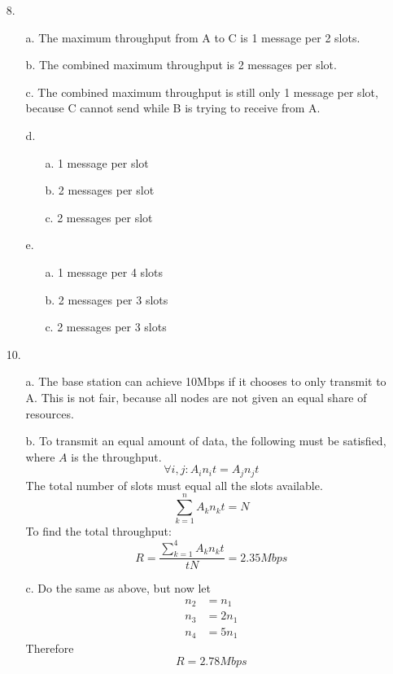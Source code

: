 \documentclass[11pt]{article}
\begin{document}
\begin{itemize}
  \item[8.]
    \begin{itemize}
      \item[a.] The maximum throughput from A to C is 1 message per 2 slots.
      \item[b.] The combined maximum throughput is 2 messages per slot.
      \item[c.] The combined maximum throughput is still only 1 message per
        slot, because C cannot send while B is trying to receive from A.
      \item[d.]
        \begin{itemize}
          \item[a.] 1 message per slot
          \item[b.] 2 messages per slot
          \item[c.] 2 messages per slot
        \end{itemize}
      \item[e.] 
        \begin{itemize}
          \item[a.] 1 message per 4 slots
          \item[b.] 2 messages per 3 slots
          \item[c.] 2 messages per 3 slots
        \end{itemize}
    \end{itemize}

  \item[10.]
    \begin{itemize}
      \item[a.] The base station can achieve 10Mbps if it chooses to only
        transmit to A.  This is not fair, because all nodes are not given an
        equal share of resources.
      \item[b.] To transmit an equal amount of data, the following must be
        satisfied, where $A$ is the throughput.
        \[ \forall i, j: A_in_it = A_jn_jt \]
        The total number of slots must equal all the slots available.
        \[ \sum_{k=1}^n A_kn_kt = N \]
        To find the total throughput:
        \[ R = \frac{\sum_{k=1}^4 A_kn_kt}{tN} = 2.35Mbps \]
      \item[c.] Do the same as above, but now let
        \begin{align*}
          n_2 &= n_1 \\
          n_3 &= 2n_1 \\
          n_4 &= 5n_1
        \end{align*}
        Therefore
        \[ R = 2.78Mbps \]
    \end{itemize}
\end{itemize}
\end{document}

